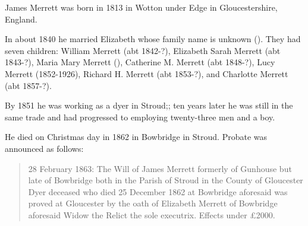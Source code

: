 
James Merrett\cite{HH-MMM-marriage} was born in 1813 in Wotton under Edge in Gloucestershire, England.

In about 1840 he married Elizabeth whose family name is unknown (). They had seven children: William Merrett (abt 1842-?), Elizabeth Sarah Merrett (abt 1843-?), Maria Mary Merrett (), Catherine M. Merrett (abt 1848-?), Lucy Merrett (1852-1926), Richard H. Merrett (abt 1853-?), and Charlotte Merrett (abt 1857-?). 

By 1851 he was working as a dyer in Stroud;\cite{Census1851Merrett}; ten years later he was still in the same trade and had progressed to employing twenty-three men and a boy.\cite{Census1861Merrett}

He died on Christmas day in 1862 in Bowbridge in Stroud. Probate was announced as follows:\cite{JamesMerrettProbate}

\begin{quotation}
28 February 1863: The Will of James Merrett formerly of Gunhouse but late of Bowbridge both in the Parish of Stroud in the County of Gloucester Dyer deceased who died 25 December 1862 at Bowbridge aforesaid was proved at Gloucester by the oath of Elizabeth Merrett of Bowbridge aforesaid Widow the Relict the sole executrix. Effects under \pounds2000.
\end{quotation}

